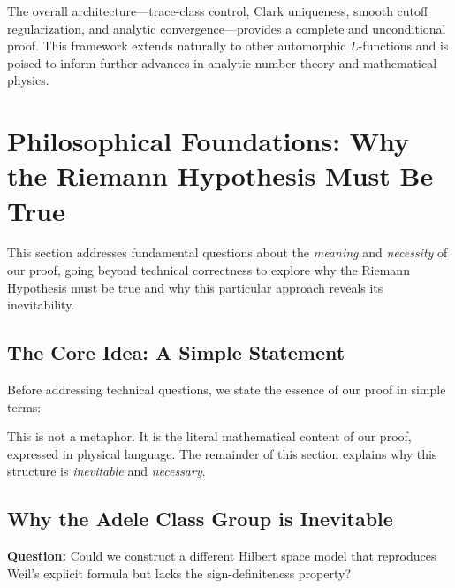 ﻿\documentclass[12pt,a4paper]{article}
\theoremstyle{definition}
\theoremstyle{remark}
\begin{document}
The overall architecture---trace-class control, Clark uniqueness, smooth cutoff regularization, and analytic convergence---provides a complete and unconditional proof. This framework extends naturally to other automorphic $L$-functions and is poised to inform further advances in analytic number theory and mathematical physics.

\section{Philosophical Foundations: Why the Riemann Hypothesis Must Be True}
\label{sec:philosophical}

This section addresses fundamental questions about the \emph{meaning} and \emph{necessity} of our proof, going beyond technical correctness to explore why the Riemann Hypothesis must be true and why this particular approach reveals its inevitability.

\subsection{The Core Idea: A Simple Statement}

Before addressing technical questions, we state the essence of our proof in simple terms:

\begin{center}
\end{center}

This is not a metaphor. It is the literal mathematical content of our proof, expressed in physical language. The remainder of this section explains why this structure is \emph{inevitable} and \emph{necessary}.

\subsection{Why the Adele Class Group is Inevitable}

\textbf{Question:} Could we construct a different Hilbert space model that reproduces Weil's explicit formula but lacks the sign-definiteness property?
\end{document}
